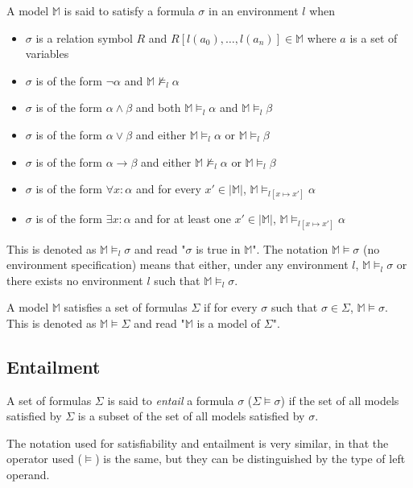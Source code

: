 		A model $\mathbb{M}$ is said to satisfy a formula $\sigma$ in an environment $l$ when
		\begin{itemize}
		\item $\sigma$ is a relation symbol $R$ and $R[l(a_0) , \ldots , l(a_n)] \in \mathbb{M}$ where $a$ is a set of variables
		\item $\sigma$ is of the form $\neg\alpha$ and $\mathbb{M} \not\models_l \alpha$
		\item $\sigma$ is of the form $\alpha\wedge\beta$ and both $\mathbb{M} \models_l \alpha$ and $\mathbb{M} \models_l \beta$
		\item $\sigma$ is of the form $\alpha\vee\beta$ and either $\mathbb{M} \models_l \alpha$ or $\mathbb{M} \models_l \beta$
		\item $\sigma$ is of the form $\alpha\to\beta$ and either $\mathbb{M} \not\models_l \alpha$ or $\mathbb{M} \models_l \beta$
		\item $\sigma$ is of the form $\forall x : \alpha$  and for every $x' \in |\mathbb{M}|$, $\mathbb{M} \models_{l[x \mapsto x']} \alpha$
		\item $\sigma$ is of the form $\exists x : \alpha$  and for at least one $x' \in |\mathbb{M}|$, $\mathbb{M} \models_{l[x \mapsto x']} \alpha$
		\end{itemize}
		This is denoted as $\mathbb{M} \models_l \sigma$ and read "$\sigma$
		is true in $\mathbb{M}$". The notation $\mathbb{M} \models \sigma$
		(no environment specification) means that either, under any
		environment $l$, $\mathbb{M} \models_l \sigma$ or there exists no
		environment $l$ such that $\mathbb{M} \models_l \sigma$.

		A model $\mathbb{M}$ satisfies a set of
		formulas $\Sigma$ if for every $\sigma$ such that $\sigma \in
		\Sigma$, $\mathbb{M} \models \sigma$.  This is denoted as
		$\mathbb{M} \models \Sigma$ and read "$\mathbb{M}$ is a model of
		$\Sigma$".

	\subsection{Entailment}

		A set of formulas $\Sigma$ is said to \emph{entail} a formula
		$\sigma$ ($\Sigma \models \sigma$) if the set of all models
		satisfied by $\Sigma$ is a subset of the set of all models
		satisfied by $\sigma$.

		The notation used for satisfiability and entailment is very
		similar, in that the operator used ($\models$) is the same, but
		they can be distinguished by the type of left operand.

